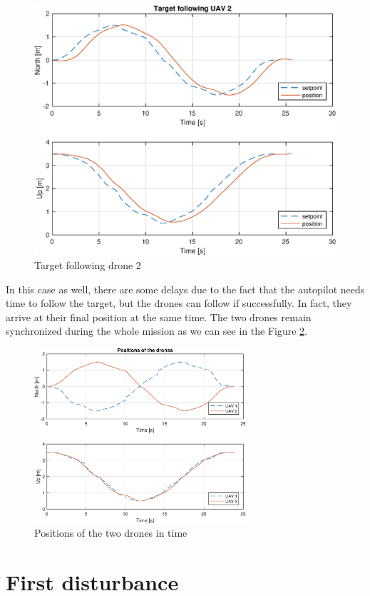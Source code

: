 \begin{figure}
\centering
\includegraphics[width=0.7\linewidth]{chapters/chapter-05/figures/following_2.eps}
\caption{Target following drone 2}
\label{fig:exp_following_2}
\end{figure}

In this case as well, there are some delays due to the fact that the autopilot
needs time to follow the target, but the drones can follow if successfully.
In fact, they arrive at their final position at the same time.
The two drones remain synchronized during the whole mission as we can see in the Figure
\ref{fig:exp_overlapped}.

\begin{figure}
\centering
\includegraphics[width=0.7\textwidth]{chapters/chapter-05/figures/overlapped.eps}
\caption{Positions of the two drones in time}
\label{fig:exp_overlapped}
\end{figure}


\section{First disturbance}

